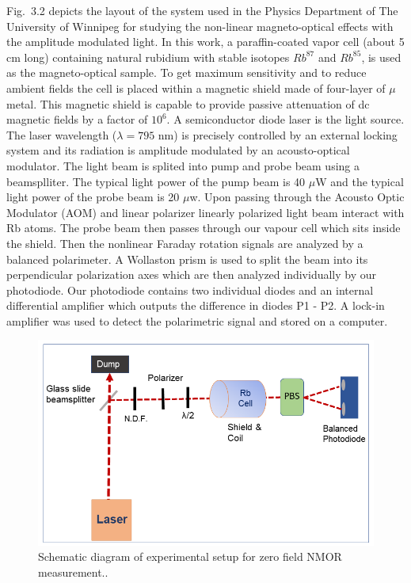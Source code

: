 Fig.~3.2 depicts the layout of the system used in the Physics
Department of The University of Winnipeg for studying the non-linear
magneto-optical effects with the amplitude modulated light. In this
work, a paraffin-coated vapor cell (about 5 cm long) containing
natural rubidium with stable isotopes $Rb^{87}$ and $Rb^{85}$, is used
as the magneto-optical sample. To get maximum sensitivity and to
reduce ambient fields the cell is placed within a magnetic shield made
of four-layer of $\mu$ metal. This magnetic shield is capable to
provide passive attenuation of dc magnetic fields by a factor of
$10^6$. A semiconductor diode laser is the light source. The laser
wavelength ($\lambda=795$ nm) is precisely controlled by an external
locking system and its radiation is amplitude modulated by an
acousto-optical modulator.  The light beam is splited into pump and
probe beam using a beamsplliter. The typical light power of the pump
beam is 40 $\mu$W and the typical light power of the probe beam is 20
$\mu$w. Upon passing through the Acousto Optic Modulator (AOM) and
linear polarizer linearly polarized light beam interact with Rb
atoms. The probe beam then passes through our vapour cell which sits
inside the shield. Then the nonlinear Faraday rotation signals are
analyzed by a balanced polarimeter.  A Wollaston prism is used to
split the beam into its perpendicular polarization axes which are then
analyzed individually by our photodiode. Our photodiode contains two
individual diodes and an internal differential amplifier which outputs
the difference in diodes P1 - P2. A lock-in amplifier was used to
detect the polarimetric signal and stored on a computer.
\begin{figure}[h]
\centering
\includegraphics[width=\textwidth]{figures/experimental_setup_zero_field}
\caption{Schematic diagram of experimental setup for zero field NMOR
  measurement.\label{fig:zerofield}.}
\end{figure}
